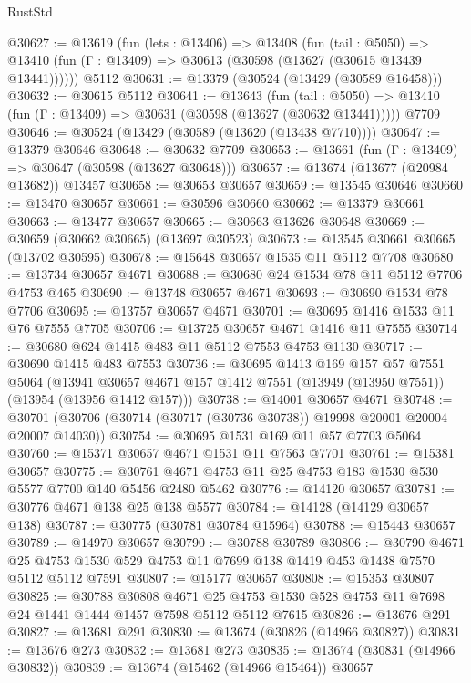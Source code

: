 \begin{lexlean}{RustStd}
\begin{coremodule}
@30627 := @13619
    (fun (lets : @13406) =>
    @13408
      (fun (tail : @5050) =>
      @13410 (fun (Γ : @13409) => @30613 (@30598 (@13627 (@30615 @13439 @13441))))))
    @5112
@30631 := @13379 (@30524 (@13429 (@30589 @16458)))
@30632 := @30615 @5112
@30641 := @13643
    (fun (tail : @5050) => @13410 (fun (Γ : @13409) => @30631 (@30598 (@13627 (@30632 @13441)))))
    @7709
@30646 := @30524 (@13429 (@30589 (@13620 (@13438 @7710))))
@30647 := @13379 @30646
@30648 := @30632 @7709
@30653 := @13661 (fun (Γ : @13409) => @30647 (@30598 (@13627 @30648)))
@30657 := @13674 (@13677 (@20984 @13682)) @13457
@30658 := @30653 @30657
@30659 := @13545 @30646
@30660 := @13470 @30657
@30661 := @30596 @30660
@30662 := @13379 @30661
@30663 := @13477 @30657
@30665 := @30663 @13626 @30648
@30669 := @30659 (@30662 @30665) (@13697 @30523)
@30673 := @13545 @30661 @30665 (@13702 @30595)
@30678 := @15648 @30657 @1535 @11 @5112 @7708
@30680 := @13734 @30657 @4671
@30688 := @30680 @24 @1534 @78 @11 @5112 @7706 @4753 @465
@30690 := @13748 @30657 @4671
@30693 := @30690 @1534 @78 @7706
@30695 := @13757 @30657 @4671
@30701 := @30695 @1416 @1533 @11 @76 @7555 @7705
@30706 := @13725 @30657 @4671 @1416 @11 @7555
@30714 := @30680 @624 @1415 @483 @11 @5112 @7553 @4753 @1130
@30717 := @30690 @1415 @483 @7553
@30736 := @30695
    @1413
    @169
    @157
    @57
    @7551
    @5064
    (@13941 @30657 @4671 @157 @1412 @7551 (@13949 (@13950 @7551)) (@13954 (@13956 @1412 @157)))
@30738 := @14001 @30657 @4671
@30748 := @30701 (@30706 (@30714 (@30717 (@30736 @30738)) @19998 @20001 @20004 @20007 @14030))
@30754 := @30695 @1531 @169 @11 @57 @7703 @5064
@30760 := @15371 @30657 @4671 @1531 @11 @7563 @7701
@30761 := @15381 @30657
@30775 := @30761 @4671 @4753 @11 @25 @4753 @183 @1530 @530 @5577 @7700 @140 @5456 @2480 @5462
@30776 := @14120 @30657
@30781 := @30776 @4671 @138 @25 @138 @5577
@30784 := @14128 (@14129 @30657 @138)
@30787 := @30775 (@30781 @30784 @15964)
@30788 := @15443 @30657
@30789 := @14970 @30657
@30790 := @30788 @30789
@30806 := @30790
    @4671
    @25
    @4753
    @1530
    @529
    @4753
    @11
    @7699
    @138
    @1419
    @453
    @1438
    @7570
    @5112
    @5112
    @7591
@30807 := @15177 @30657
@30808 := @15353 @30807
@30825 := @30788
    @30808
    @4671
    @25
    @4753
    @1530
    @528
    @4753
    @11
    @7698
    @24
    @1441
    @1444
    @1457
    @7598
    @5112
    @5112
    @7615
@30826 := @13676 @291
@30827 := @13681 @291
@30830 := @13674 (@30826 (@14966 @30827))
@30831 := @13676 @273
@30832 := @13681 @273
@30835 := @13674 (@30831 (@14966 @30832))
@30839 := @13674 (@15462 (@14966 @15464)) @30657

\end{coremodule}
\end{lexlean}
